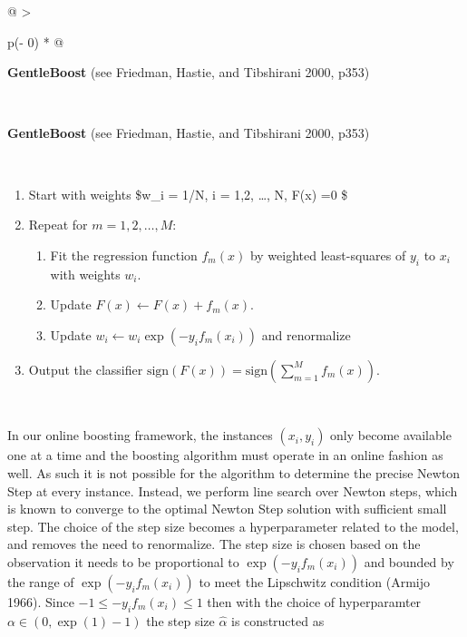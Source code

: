 \documentclass[
]{article}
\providecommand{\tightlist}{%
  \setlength{\itemsep}{0pt}\setlength{\parskip}{0pt}}\usepackage{longtable,booktabs,array}
\begin{document}
\hypertarget{tbl-gentleboost}{}
\begin{longtable}[]{@{}
  >{\raggedright\arraybackslash}p{(\columnwidth - 0\tabcolsep) * }@{}}
\caption{\label{tbl-gentleboost}GentleBoost algorithm which is a
modified version of AdaBoost that uses Newton stepping rather than exact
optimization at each step}\tabularnewline
\toprule\noalign{}
\begin{minipage}[b]{\linewidth}\raggedright
\textbf{GentleBoost} (see Friedman, Hastie, and Tibshirani 2000, p353)
\textbar{}
\end{minipage} \\
\midrule\noalign{}
\endfirsthead
\toprule\noalign{}
\begin{minipage}[b]{\linewidth}\raggedright
\textbf{GentleBoost} (see Friedman, Hastie, and Tibshirani 2000, p353)
\textbar{}
\end{minipage} \\
\midrule\noalign{}
\endhead
\bottomrule\noalign{}
\endlastfoot
\begin{minipage}[t]{\linewidth}\raggedright
\begin{enumerate}
\def\labelenumi{\arabic{enumi}.}
\tightlist
\item
  Start with weights \$w\_i = 1/N, i = 1,2, \dots, N, F(x) =0 \$
\item
  Repeat for \(m = 1,2, \dots, M\):

  \begin{enumerate}
  \def\labelenumii{\alph{enumii}.}
  \tightlist
  \item
    Fit the regression function \(f_m(x)\) by weighted least-squares of
    \(y_i\) to \(x_i\) with weights \(w_i\).
  \item
    Update \(F(x) \leftarrow F(x) + f_m(x)\).
  \item
    Update \(w_i \leftarrow w_i \exp(-y_i f_m(x_i))\) and renormalize
  \end{enumerate}
\item
  Output the classifier
  \(\text{sign}(F(x)) = \text{sign}(\sum_{m=1}^M f_m(x))\).
\end{enumerate}
\end{minipage} \\
\end{longtable}

In our online boosting framework, the instances \((x_i, y_i)\) only
become available one at a time and the boosting algorithm must operate
in an online fashion as well. As such it is not possible for the
algorithm to determine the precise Newton Step at every instance.
Instead, we perform line search over Newton steps, which is known to
converge to the optimal Newton Step solution with sufficient small step.
The choice of the step size becomes a hyperparameter related to the
model, and removes the need to renormalize. The step size is chosen
based on the observation it needs to be proportional to
\(\exp(-y_i f_m(x_i))\) and bounded by the range of
\(\exp(-y_i f_m(x_i))\) to meet the Lipschwitz condition (Armijo 1966).
Since \(-1 \leq -y_i f_m(x_i) \leq 1\) then with the choice of
hyperparamter \(\alpha \in (0, \exp(1)-1)\) the step size
\(\hat{\alpha}\) is constructed as
\end{document}
